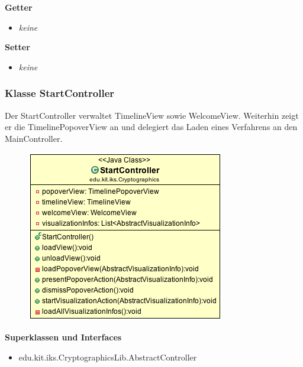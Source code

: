 \documentclass{article}
\begin{document}
      \textbf{Getter}
      \begin{itemize}
        \item \textit{keine}
      \end{itemize}

      \textbf{Setter}
      \begin{itemize}
        \item \textit{keine}
      \end{itemize}

    \subsubsection{Klasse StartController}
      Der StartController verwaltet TimelineView sowie WelcomeView. Weiterhin zeigt er die TimelinePopoverView an und delegiert das Laden eines Verfahrens an den MainController.
      \begin{figure}[H]
        \centering
        \includegraphics[width=\textwidth]{resources/edu-kit-iks-Cryptographics-StartController}
      \end{figure}

      \textbf{Superklassen und Interfaces}
      \begin{itemize}
        \item edu.kit.iks.CryptographicsLib.AbstractController
      \end{itemize}
      
\end{document}
